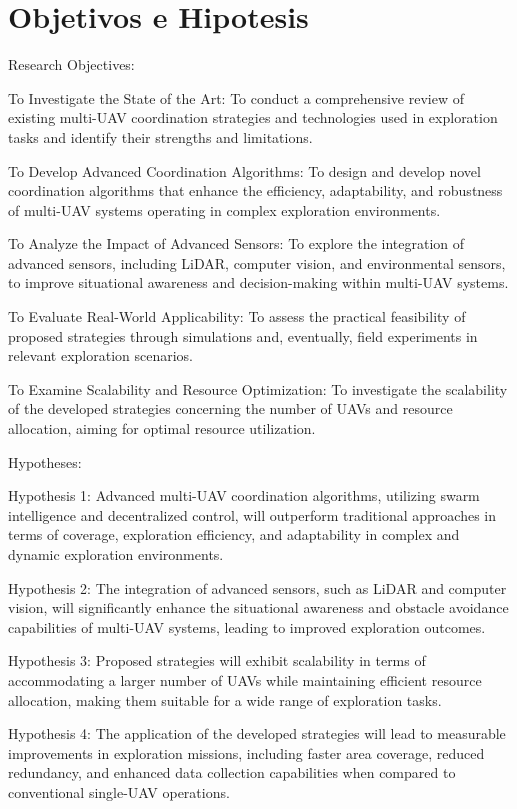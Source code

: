 \documentclass[sigconf]{acmart}
\begin{document}
\section{Objetivos e Hipotesis}

Research Objectives:

    To Investigate the State of the Art: To conduct a comprehensive review of existing multi-UAV coordination strategies and technologies used in exploration tasks and identify their strengths and limitations.

    To Develop Advanced Coordination Algorithms: To design and develop novel coordination algorithms that enhance the efficiency, adaptability, and robustness of multi-UAV systems operating in complex exploration environments.

    To Analyze the Impact of Advanced Sensors: To explore the integration of advanced sensors, including LiDAR, computer vision, and environmental sensors, to improve situational awareness and decision-making within multi-UAV systems.

    To Evaluate Real-World Applicability: To assess the practical feasibility of proposed strategies through simulations and, eventually, field experiments in relevant exploration scenarios.

    To Examine Scalability and Resource Optimization: To investigate the scalability of the developed strategies concerning the number of UAVs and resource allocation, aiming for optimal resource utilization.

Hypotheses:

    Hypothesis 1: Advanced multi-UAV coordination algorithms, utilizing swarm intelligence and decentralized control, will outperform traditional approaches in terms of coverage, exploration efficiency, and adaptability in complex and dynamic exploration environments.

    Hypothesis 2: The integration of advanced sensors, such as LiDAR and computer vision, will significantly enhance the situational awareness and obstacle avoidance capabilities of multi-UAV systems, leading to improved exploration outcomes.

    Hypothesis 3: Proposed strategies will exhibit scalability in terms of accommodating a larger number of UAVs while maintaining efficient resource allocation, making them suitable for a wide range of exploration tasks.

    Hypothesis 4: The application of the developed strategies will lead to measurable improvements in exploration missions, including faster area coverage, reduced redundancy, and enhanced data collection capabilities when compared to conventional single-UAV operations.
\end{document}
